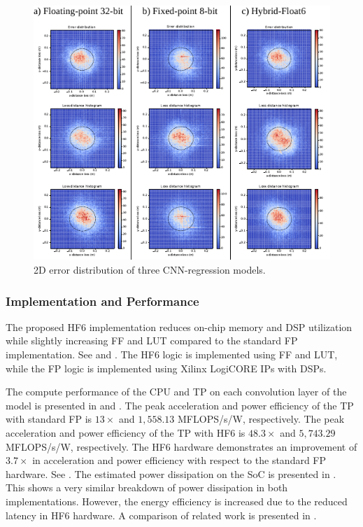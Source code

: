 \begin{figure}[t!]
	\centering
	\includegraphics[width=1\columnwidth]{../figures/histograms/2D_error_distribtion.pdf}
	\caption{2D error distribution of three CNN-regression models.}
	\label{fig:2d_error_distribtion}
\end{figure}

\subsubsection{Implementation and Performance}
The proposed HF6 implementation reduces on-chip memory and DSP utilization while slightly increasing FF and LUT compared to the standard FP implementation. See  and . The HF6 logic is implemented using FF and LUT, while the FP logic is implemented using Xilinx LogiCORE IPs with DSPs.

The compute performance of the CPU and TP on each convolution layer of the model is presented in  and . 
The peak acceleration and power efficiency of the TP with standard FP is $13\times$ and $1,558.13$ MFLOPS/s/W, respectively. The peak acceleration and power efficiency of the TP with HF6 is $48.3\times$ and $5,743.29$ MFLOPS/s/W, respectively. The HF6 hardware demonstrates an improvement of $3.7\times$ in acceleration and power efficiency with respect to the standard FP hardware. See . The estimated power dissipation on the SoC is presented in . This shows a very similar breakdown of power dissipation in both implementations. However, the energy efficiency is increased due to the reduced latency in HF6 hardware. A comparison of related work is presented in .

